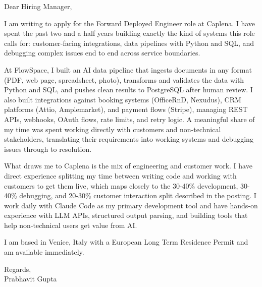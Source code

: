 \documentclass[a4paper,11pt]{article}
\begin{document}
Dear Hiring Manager,

I am writing to apply for the Forward Deployed Engineer role at Caplena. I have spent the past two and a half years building exactly the kind of systems this role calls for: customer-facing integrations, data pipelines with Python and SQL, and debugging complex issues end to end across service boundaries.

At FlowSpace, I built an AI data pipeline that ingests documents in any format (PDF, web page, spreadsheet, photo), transforms and validates the data with Python and SQL, and pushes clean results to PostgreSQL after human review. I also built integrations against booking systems (OfficeRnD, Nexudus), CRM platforms (Attio, Amplemarket), and payment flows (Stripe), managing REST APIs, webhooks, OAuth flows, rate limits, and retry logic. A meaningful share of my time was spent working directly with customers and non-technical stakeholders, translating their requirements into working systems and debugging issues through to resolution.

What draws me to Caplena is the mix of engineering and customer work. I have direct experience splitting my time between writing code and working with customers to get them live, which maps closely to the 30-40\% development, 30-40\% debugging, and 20-30\% customer interaction split described in the posting. I work daily with Claude Code as my primary development tool and have hands-on experience with LLM APIs, structured output parsing, and building tools that help non-technical users get value from AI.

I am based in Venice, Italy with a European Long Term Residence Permit and am available immediately.

Regards,\\
Prabhavit Gupta
\end{document}
